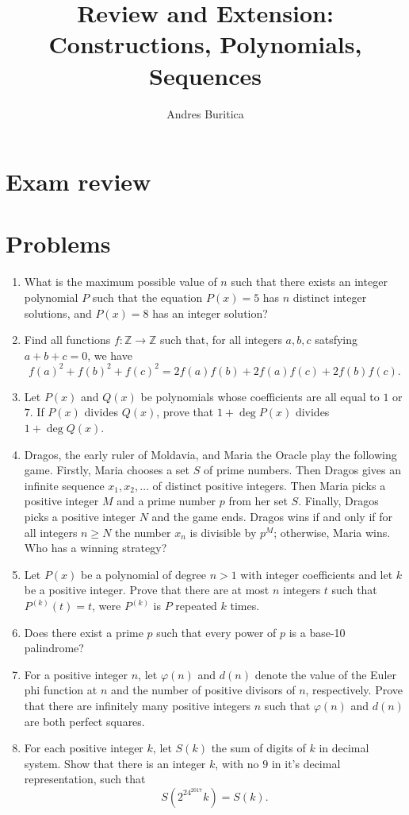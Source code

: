 \documentclass{article}
\title{Review and Extension: Constructions, Polynomials, Sequences}
\author{Andres Buritica}
\date{}
\newcommand\Zz{\mathbb{Z}}
\begin{document}
\maketitle
\section{Exam review}
\newpage
\section{Problems}
\begin{enumerate}
  \item What is the maximum possible value of $n$ such that there exists an
    integer polynomial $P$ such that the equation $P(x)=5$ has $n$
    distinct integer solutions, and $P(x)=8$ has an integer solution?
  \item Find all functions $f:\Zz\to\Zz$ such that, for all integers $a,b,c$
    satsfying $a+b+c=0$, we have
    \[f(a)^2+f(b)^2+f(c)^2=2f(a)f(b)+2f(a)f(c)+2f(b)f(c).\]
  \item Let $P(x)$ and $Q(x)$ be polynomials whose coefficients are all equal to
    $1$ or $7$. If $P(x)$ divides $Q(x)$, prove that $1+\deg P(x)$ divides
    $1+\deg Q(x)$.
  \item  Dragos, the early ruler of Moldavia, and Maria the Oracle play the
    following game. Firstly, Maria chooses a set $S$ of prime numbers. Then
    Dragos gives an infinite sequence $x_1, x_2, \ldots$ of distinct positive
    integers. Then Maria picks a positive integer $M$ and a prime number $p$
    from her set $S$. Finally, Dragos picks a positive integer $N$ and the
    game ends. Dragos wins if and only if for all integers $n \ge N$ the number
    $x_n$ is divisible by $p^M$; otherwise, Maria wins. Who has a winning
    strategy?
  \item Let $P(x)$ be a polynomial of degree $n>1$ with integer coefficients and
    let $k$ be a positive integer. Prove that there are at most $n$ integers $t$
    such that $P^{(k)}(t)=t$, were $P^{(k)}$ is $P$ repeated $k$ times.
  \item Does there exist a prime $p$ such that every power of $p$ is a base-10
    palindrome?
  \item For a positive integer $n$, let $\varphi(n)$ and $d(n)$ denote the value
    of the Euler phi function at $n$ and the number of positive divisors of $n$,
    respectively. Prove that there are infinitely many positive integers $n$
    such that $\varphi(n)$ and $d(n)$ are both perfect squares.
  \item For each positive integer $k$, let $S(k)$ the sum of digits of $k$ in
    decimal system.
    Show that there is an integer $k$, with no $9$ in it's decimal
    representation, such that
    \[S(2^{24^{2017}}k)=S(k).\]
\end{enumerate}
\end{document}
